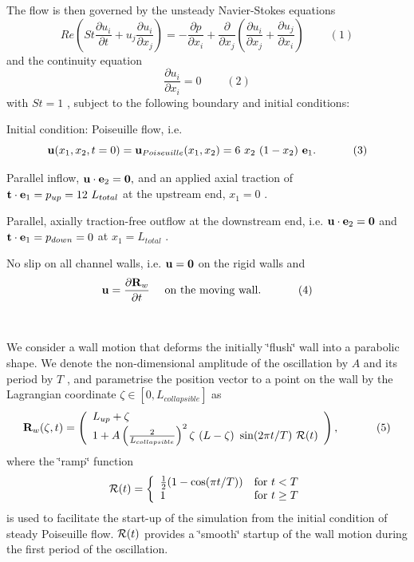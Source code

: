 \begin{center}
\begin{longtabu}
The flow is then governed by the unsteady Navier-\/\+Stokes equations \[ Re\left(St\frac{\partial u_i}{\partial t} + u_j\frac{\partial u_i}{\partial x_j}\right) = - \frac{\partial p}{\partial x_i} + \frac{\partial }{\partial x_j} \left( \frac{\partial u_i}{\partial x_j} + \frac{\partial u_j}{\partial x_i} \right) \ \ \ \ \ \ \ \ \ \ (1) \] and the continuity equation \[ \frac{\partial u_i}{\partial x_i} = 0 \ \ \ \ \ \ \ \ \ \ (2) \] with $ St=1 $ , subject to the following boundary and initial conditions\+:
\begin{DoxyItemize}
\item Initial condition\+: Poiseuille flow, i.\+e. \[ {\bf u}(x_1,x_2,t=0) = {\bf u}_{Poiseuille}(x_1,x_2) = 6 \ x_2 \ (1-x_2) \ {\bf e}_1. \ \ \ \ \ \ \ \ \ \ (3) \]
\item Parallel inflow, $ {\bf u} \cdot {\bf e}_2 = {\bf 0}, $ and an applied axial traction of $ {\bf t} \cdot {\bf e}_1 = p_{up} = 12 \ L_{total} $ at the upstream end, $ x_1=0 $ .
\item Parallel, axially traction-\/free outflow at the downstream end, i.\+e. $ {\bf u} \cdot {\bf e}_2 = {\bf 0} $ and $ {\bf t} \cdot {\bf e}_1 = p_{down} = 0 $ at $ x_1=L_{total} $ .
\item No slip on all channel walls, i.\+e. $ {\bf u} = {\bf 0} $ on the rigid walls and \[ {\bf u} = \frac{\partial {\bf R}_w}{\partial t} \mbox{\ \ \ \ on the moving wall.} \ \ \ \ \ \ \ \ \ \ (4) \]
\end{DoxyItemize}

\\
\end{longtabu}
\end{center} 

We consider a wall motion that deforms the initially \char`\"{}flush\char`\"{} wall into a parabolic shape. We denote the non-\/dimensional amplitude of the oscillation by $ A $ and its period by $ T $ , and parametrise the position vector to a point on the wall by the Lagrangian coordinate $ \zeta \in [0,L_{collapsible}] $ as \[ {\bf R}_w(\zeta,t) = \left( \begin{array}{l} L_{up} + \zeta \\ 1 + A \left(\frac{2}{L_{collapsible}}\right)^2 \zeta \ (L-\zeta) \ \sin(2\pi t / T) \ {\cal R}(t) \end{array} \right), \ \ \ \ \ \ \ \ \ \ (5) \] where the \char`\"{}ramp\char`\"{} function \[ {\cal R}(t) = \left\{ \begin{array}{ll} \frac{1}{2}(1-\cos(\pi t/T)) & \mbox{for $t<T$} \\ 1 & \mbox{for $t \ge T$} \end{array} \right. \] is used to facilitate the start-\/up of the simulation from the initial condition of steady Poiseuille flow. $ {\cal R}(t) $ provides a \char`\"{}smooth\char`\"{} startup of the wall motion during the first period of the oscillation.



